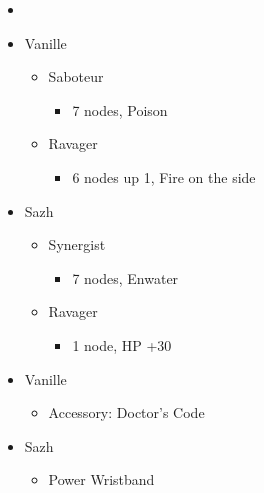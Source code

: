 \begin{menu}
\begin{multicols}{2}
\begin{itemize}
    \paradigm
    \begin{itemize}
        \item {}%
{\paradigmline{\rav}{\com}{}}%
{\paradigmline[2]{\textit{(\sab)}}{\textit{(\syn)}}{}}%
{\paradigmline{\sab}{\syn}{}}%
{\paradigmline{\rav}{\rav}{}}%
{\paradigmline{[\sab]}{(\rav)}{}}%
{\paradigmline{[\sab]}{\com}{}}
    \end{itemize}
    \columnbreak
    \crystarium
    \begin{itemize}
        \item Vanille
        \begin{itemize}
            \item Saboteur
            \begin{itemize}
                \item 7 nodes, Poison
            \end{itemize}
            \item Ravager
            \begin{itemize}
                \item 6 nodes up 1, Fire on the side
            \end{itemize}
        \end{itemize}
        \item Sazh
        \begin{itemize}
            \item Synergist
            \begin{itemize}
                \item 7 nodes, Enwater
            \end{itemize}
            \item Ravager
            \begin{itemize}
                \item 1 node, HP +30
            \end{itemize}
        \end{itemize}
    \end{itemize}
    \equip
    \begin{itemize}
        \item Vanille
        \begin{itemize}
                \item Accessory: Doctor's Code
        \end{itemize}
        \item Sazh
        \begin{itemize}
                \item Power Wristband
        \end{itemize}
    \end{itemize}
\end{itemize}
\end{multicols} 
\end{menu}

